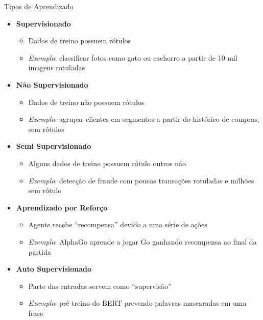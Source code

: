 \documentclass[aspectratio=169,xcolor=dvipsnames]{beamer}
\begin{document}
\begin{frame}{Tipos de Aprendizado}
    \begin{itemize}
        \item \textbf{Supervisionado}
        \begin{itemize}
            \item Dados de treino possuem rótulos
            \item \textit{Exemplo}: classificar fotos como gato ou cachorro a partir de 10 mil imagens rotuladas
        \end{itemize}
        \item \textbf{Não Supervisionado}
        \begin{itemize}
            \item Dados de treino não possuem rótulos
            \item \textit{Exemplo}: agrupar clientes em segmentos a partir do histórico de compras, sem rótulos
        \end{itemize}
        \item \textbf{Semi Supervisionado}
        \begin{itemize}
            \item Alguns dados de treino possuem rótulo outros não
            \item \textit{Exemplo}: detecção de fraude com poucas transações rotuladas e milhões sem rótulo
        \end{itemize}
        \item \textbf{Aprendizado por Reforço}
        \begin{itemize}
            \item Agente recebe “recompensa” devido a uma série de ações
            \item \textit{Exemplo}: AlphaGo aprende a jogar Go ganhando recompensa ao final da partida
        \end{itemize}
        \item \textbf{Auto Supervisionado}
        \begin{itemize}
            \item Parte das entradas servem como “supervisão”
            \item \textit{Exemplo}: pré-treino do BERT prevendo palavras mascaradas em uma frase
        \end{itemize}
    \end{itemize}
\end{frame}
\end{document}
